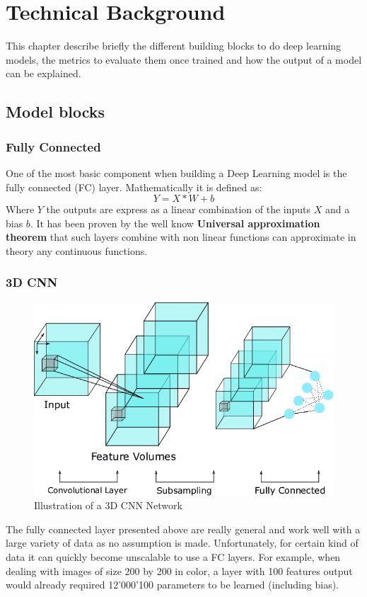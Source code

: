 \chapter{Technical Background}
This chapter describe briefly the different building blocks to do deep learning models, the metrics to evaluate them once trained and how the output of a model can be explained.

\section{Model blocks}

\subsection{Fully Connected}

One of the most basic component when building a Deep Learning model is the fully connected (FC) layer. Mathematically it is defined as:
$$Y=X*W + b$$
Where $Y$ the outputs are express as a linear combination of the inputs $X$ and a bias $b$. It has been proven by the well know \textbf{Universal approximation theorem} that such layers combine with non linear functions can approximate in theory any continuous functions.

\subsection{3D CNN}

\begin{figure}
 \centering
 \includegraphics[width=.9\linewidth]{figures/3D_CNN_example.png}
 \captionsetup{width=.9\linewidth}
 \caption[3D_CNN_example]{Illustration\footnotemark{} of a 3D CNN Network}
 \label{fig:3d_cnn_example}
\end{figure}
The fully connected layer presented above are really general and work well with a large variety of data as no assumption is made. Unfortunately, for certain kind of data it can quickly become unscalable to use a FC layers. For example, when dealing with images of size 200 by 200 in color, a layer with 100 features output would already required 12'000'100 parameters to be learned (including bias).

